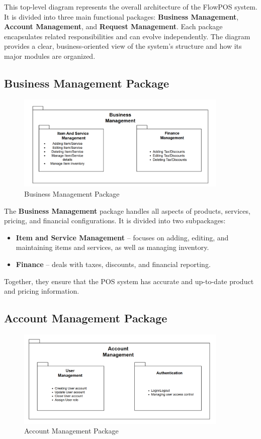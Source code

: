 \documentclass[11pt,a4paper,pdftex]{article}
\begin{document}
This top-level diagram represents the overall architecture of the FlowPOS system. 
It is divided into three main functional packages: \textbf{Business Management}, \textbf{Account Management}, and \textbf{Request Management}. 
Each package encapsulates related responsibilities and can evolve independently. 
The diagram provides a clear, business-oriented view of the system’s structure and how its major modules are organized.

\subsection{Business Management Package}

\begin{figure}[H]
    \centering
    \includegraphics[width=0.9\textwidth]{graphics/Package13.png}
    \caption{Business Management Package}
    \label{fig:package2}
\end{figure}

The \textbf{Business Management} package handles all aspects of products, services, pricing, and financial configurations. 
It is divided into two subpackages:
\begin{itemize}
    \item \textbf{Item and Service Management} – focuses on adding, editing, and maintaining items and services, as well as managing inventory.
    \item \textbf{Finance} – deals with taxes, discounts, and financial reporting.
\end{itemize}
Together, they ensure that the POS system has accurate and up-to-date product and pricing information.

\subsection{Account Management Package}

\begin{figure}[H]
    \centering
    \includegraphics[width=0.9\textwidth]{graphics/Package12.png}
    \caption{Account Management Package}
    \label{fig:package3}
\end{figure}
\end{document}
